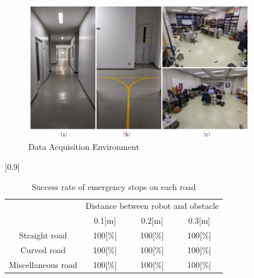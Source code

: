 \begin{figure}[h]
  \begin{center}
  \includegraphics[height=60mm,clip]{figure/2-1_Data-Acquisition-Environment.png}
  \caption{Data Acquisition Environment\cite{深層学習を用いた人追従機能の開発}}
  \label{2-1_Data Acquisition Environment}
  \end{center}
\end{figure}

\begin{table}[h]
  \begin{center}
    \caption{{Success rate of emergency stops on each road\cite{深層学習を用いた人追従機能の開発}}
    \label{2-1_Success rate of emergency stops on each road}}
    \scalebox{1.0}[0.9]{
      \begin{tabular}{c|ccc} \hline
        \multicolumn{1}{c|}{} & \multicolumn{3}{c}{Distance between robot and obstacle} \\
        \cline{2-4}
        \multicolumn{1}{c|}{}
          & 0.1[m] & 0.2[m] & 0.3[m] \\ \hline
          Straight road & 100[\%] & 100[\%] & 100[\%] \\
          Curved road & 100[\%] & 100[\%] & 100[\%] \\
          Miscellaneous road & 100[\%] & 100[\%] & 100[\%] \\ \hline
      \end{tabular}
    }
  \end{center}
\end{table}
\clearpage
